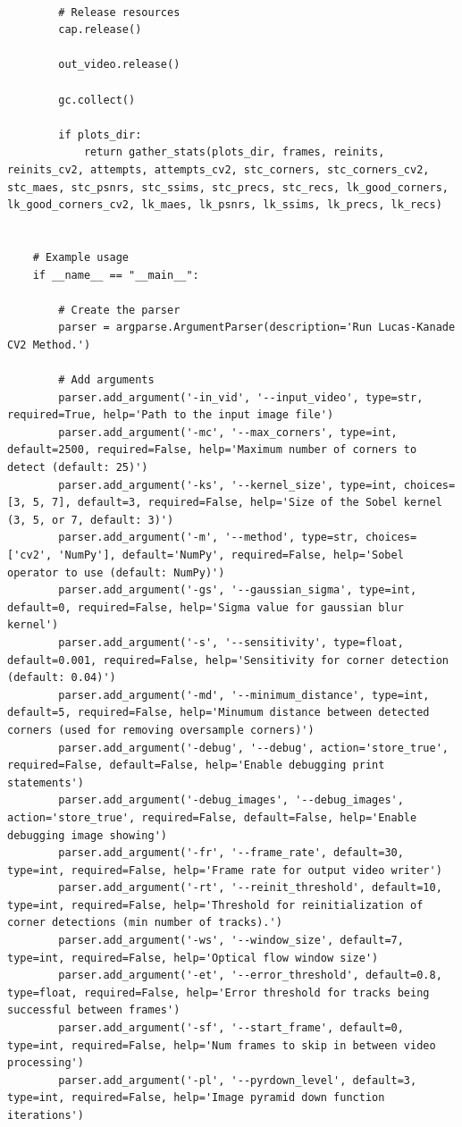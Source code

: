 \documentclass[11pt, conference, letterpaper]{IEEEtran}
\begin{document}
\begin{lstlisting}[style=python, caption={\texttt{lucas\_kanade.py}}, label={lst:lk}]
    
        # Release resources
        cap.release()
    
        out_video.release()
        
        gc.collect()
        
        if plots_dir:
            return gather_stats(plots_dir, frames, reinits, reinits_cv2, attempts, attempts_cv2, stc_corners, stc_corners_cv2, stc_maes, stc_psnrs, stc_ssims, stc_precs, stc_recs, lk_good_corners, lk_good_corners_cv2, lk_maes, lk_psnrs, lk_ssims, lk_precs, lk_recs)
    
    
    # Example usage
    if __name__ == "__main__":
    
        # Create the parser
        parser = argparse.ArgumentParser(description='Run Lucas-Kanade CV2 Method.')
    
        # Add arguments
        parser.add_argument('-in_vid', '--input_video', type=str, required=True, help='Path to the input image file')
        parser.add_argument('-mc', '--max_corners', type=int, default=2500, required=False, help='Maximum number of corners to detect (default: 25)')
        parser.add_argument('-ks', '--kernel_size', type=int, choices=[3, 5, 7], default=3, required=False, help='Size of the Sobel kernel (3, 5, or 7, default: 3)')
        parser.add_argument('-m', '--method', type=str, choices=['cv2', 'NumPy'], default='NumPy', required=False, help='Sobel operator to use (default: NumPy)')
        parser.add_argument('-gs', '--gaussian_sigma', type=int, default=0, required=False, help='Sigma value for gaussian blur kernel')
        parser.add_argument('-s', '--sensitivity', type=float, default=0.001, required=False, help='Sensitivity for corner detection (default: 0.04)')
        parser.add_argument('-md', '--minimum_distance', type=int, default=5, required=False, help='Minumum distance between detected corners (used for removing oversample corners)')
        parser.add_argument('-debug', '--debug', action='store_true', required=False, default=False, help='Enable debugging print statements')
        parser.add_argument('-debug_images', '--debug_images', action='store_true', required=False, default=False, help='Enable debugging image showing')
        parser.add_argument('-fr', '--frame_rate', default=30, type=int, required=False, help='Frame rate for output video writer')
        parser.add_argument('-rt', '--reinit_threshold', default=10, type=int, required=False, help='Threshold for reinitialization of corner detections (min number of tracks).')
        parser.add_argument('-ws', '--window_size', default=7, type=int, required=False, help='Optical flow window size')
        parser.add_argument('-et', '--error_threshold', default=0.8, type=float, required=False, help='Error threshold for tracks being successful between frames')
        parser.add_argument('-sf', '--start_frame', default=0, type=int, required=False, help='Num frames to skip in between video processing')
        parser.add_argument('-pl', '--pyrdown_level', default=3, type=int, required=False, help='Image pyramid down function iterations')
    

\end{lstlisting}
\end{document}
